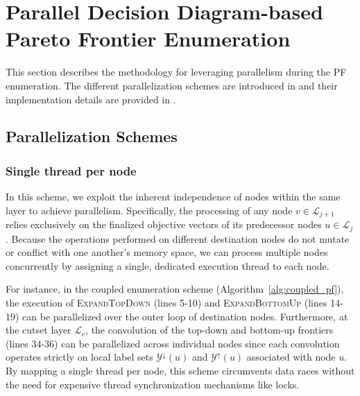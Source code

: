 \documentclass[letterpaper]{article}
\begin{document}
\section{Parallel Decision Diagram-based Pareto Frontier Enumeration}
\label{sec:method}

This section describes the methodology for leveraging parallelism during the PF enumeration. The different parallelization schemes are introduced in  and their implementation details are provided in .

\subsection{Parallelization Schemes}
\label{sec:parallel_schemes}

\subsubsection{Single thread per node}
In this scheme, we exploit the inherent independence of nodes within the same layer to achieve parallelism. Specifically, the processing of any node $v \in \mathcal{L}_{j+1}$ relies exclusively on the finalized objective vectors of its predecessor nodes $u \in \mathcal{L}_j$. Because the operations performed on different destination nodes do not mutate or conflict with one another's memory space, we can process multiple nodes concurrently by assigning a single, dedicated execution thread to each node.

For instance, in the coupled enumeration scheme (Algorithm~\ref{alg:coupled_pf}), the execution of \textsc{ExpandTopDown} (lines 5-10) and \textsc{ExpandBottomUp} (lines 14-19) can be parallelized over the outer loop of destination nodes. 
Furthermore, at the cutset layer $\mathcal{L}_c$, the convolution of the top-down and bottom-up frontiers (lines 34-36) can be parallelized across individual nodes since each convolution operates strictly on local label sets $\mathcal{Y}^{\downarrow}(u)$ and $\mathcal{Y}^{\uparrow}(u)$ associated with node $u$.
By mapping a single thread per node, this scheme circumvents data races without the need for expensive thread synchronization mechanisms like locks. 
\end{document}
